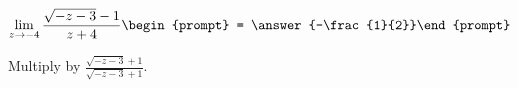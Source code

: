 \documentclass{ximera}
\author{Bart Snapp}
\begin{document}
\begin{exercise}

\[
\lim_{z\to -4 } \frac{\sqrt{-z-3}-1}{z+4}\begin{prompt} = \answer{-\frac{1}{2}}\end{prompt}
\]
\begin{hint}
Multiply by $\frac{\sqrt{-z-3}+1}{\sqrt{-z-3}+1}$.
\end{hint}
\end{exercise}
\end{document}

